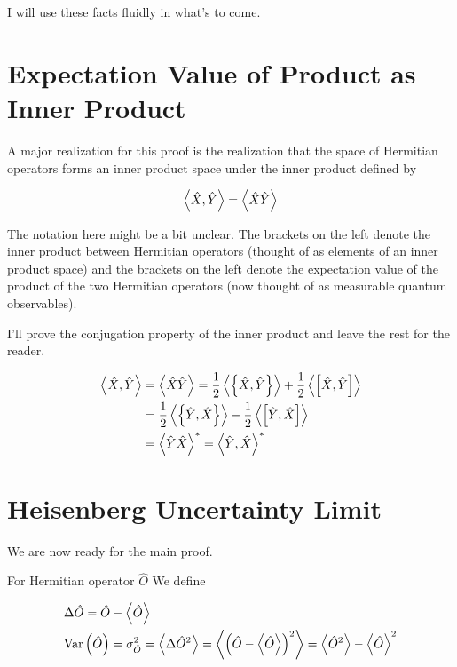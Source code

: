 \documentclass[12pt]{article}
\begin{document}
I will use these facts fluidly in what's to come.

\section{Expectation Value of Product as Inner Product}

A major realization for this proof is the realization that the space of Hermitian operators forms an inner product space under the inner product defined by

\begin{align}
\Braket{\hat{X},\hat{Y}} = \Braket{\hat{X}\hat{Y}}
\end{align}

The notation here might be a bit unclear. The brackets on the left denote the inner product between Hermitian operators (thought of as elements of an inner product space) and the brackets on the left denote the expectation value of the product of the two Hermitian operators (now thought of as measurable quantum observables).

I'll prove the conjugation property of the inner product and leave the rest for the reader.

\begin{align}
\Braket{\hat{X},\hat{Y}} &= \Braket{\hat{X}\hat{Y}} = \frac{1}{2}\Braket{\left\{\hat{X},\hat{Y}\right\}} + \frac{1}{2}\Braket{\left[\hat{X},\hat{Y}\right]}\\
&=\frac{1}{2}\Braket{\left\{\hat{Y},\hat{X}\right\}} - \frac{1}{2}\Braket{\left[\hat{Y},\hat{X}\right]}\\
&=\Braket{\hat{Y}\hat{X}}^* = \Braket{\hat{Y},\hat{X}}^*
\end{align}

\section{Heisenberg Uncertainty Limit}

We are now ready for the main proof.

For Hermitian operator $\hat{O}$  We define

\begin{align}
&\Delta\hat{O} = \hat{O} - \Braket{\hat{O}}\\
&\text{Var}\left(\hat{O}\right) = \sigma_{\hat{O}}^2 = \Braket{\Delta \hat{O}^2} = \Braket{\left(\hat{O}-\Braket{\hat{O}}\right)^2} = \Braket{\hat{O}^2} - \Braket{\hat{O}}^2
\end{align}
\end{document}
